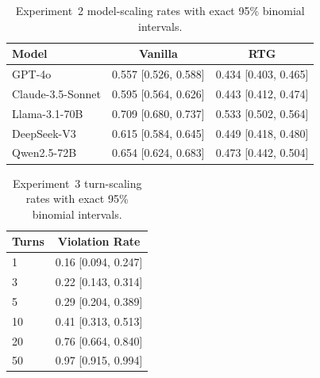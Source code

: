 \begin{table}[H]
\centering
\scriptsize
\caption{Experiment~2 model-scaling rates with exact 95\% binomial intervals.}
\begin{tabular}{lcc}
\toprule
\textbf{Model} & \textbf{Vanilla} & \textbf{RTG} \\
\midrule
GPT-4o & 0.557 [0.526, 0.588] & 0.434 [0.403, 0.465] \\
Claude-3.5-Sonnet & 0.595 [0.564, 0.626] & 0.443 [0.412, 0.474] \\
Llama-3.1-70B & 0.709 [0.680, 0.737] & 0.533 [0.502, 0.564] \\
DeepSeek-V3 & 0.615 [0.584, 0.645] & 0.449 [0.418, 0.480] \\
Qwen2.5-72B & 0.654 [0.624, 0.683] & 0.473 [0.442, 0.504] \\
\bottomrule
\end{tabular}
\label{tab:supp_exp2_stats}
\end{table}

\begin{table}[H]
\centering
\scriptsize
\caption{Experiment~3 turn-scaling rates with exact 95\% binomial intervals.}
\begin{tabular}{lc}
\toprule
\textbf{Turns} & \textbf{Violation Rate} \\
\midrule
1 & 0.16 [0.094, 0.247] \\
3 & 0.22 [0.143, 0.314] \\
5 & 0.29 [0.204, 0.389] \\
10 & 0.41 [0.313, 0.513] \\
20 & 0.76 [0.664, 0.840] \\
50 & 0.97 [0.915, 0.994] \\
\bottomrule
\end{tabular}
\label{tab:supp_exp3_stats}
\end{table}

